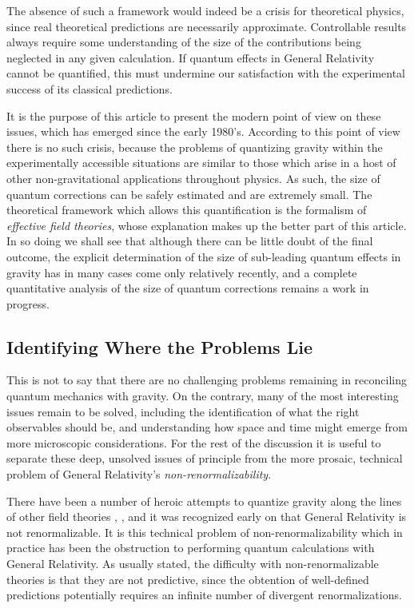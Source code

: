 \documentclass[11pt]{article}
\begin{document}
The absence of such a framework would indeed be a crisis for
theoretical physics, since real theoretical predictions are
necessarily approximate. Controllable results always require some
understanding of the size of the contributions being neglected in
any given calculation. If quantum effects in General Relativity
cannot be quantified, this must undermine our satisfaction with
the experimental success of its classical predictions.

It is the purpose of this article to present the modern point of
view on these issues, which has emerged since the early 1980's.
According to this point of view there is no such crisis, because
the problems of quantizing gravity within the experimentally
accessible situations are similar to those which arise in a host
of other non-gravitational applications throughout physics. As
such, the size of quantum corrections can be safely estimated and
are extremely small. The theoretical framework which allows this
quantification is the formalism of \emph{effective field
theories}, whose explanation makes up the better part of this
article. In so doing we shall see that although there can be
little doubt of the final outcome, the explicit determination of
the size of sub-leading quantum effects in gravity has in many
cases come only relatively recently, and a complete quantitative
analysis of the size of quantum corrections remains a work in
progress.

\subsection{Identifying Where the Problems Lie}
%
This is not to say that there are no challenging problems
remaining in reconciling quantum mechanics with gravity. On the
contrary, many of the most interesting issues remain to be solved,
including the identification of what the right observables should
be, and understanding how space and time might emerge from more
microscopic considerations. For the rest of the discussion it is
useful to separate these deep, unsolved issues of principle from
the more prosaic, technical problem of General Relativity's
\emph{non-renormalizability}.

There have been a number of heroic attempts to quantize gravity
along the lines of other field theories \cite{EarlyQG},
\cite{CanonQG}, \cite{LivRev-QG} and it was recognized early on
that General Relativity is not renormalizable. It is this
technical problem of non-renormalizability which in practice has
been the obstruction to performing quantum calculations with
General Relativity. As usually stated, the difficulty with
non-renormalizable theories is that they are not predictive, since
the obtention of well-defined predictions potentially requires an
infinite number of divergent renormalizations.
\end{document}
